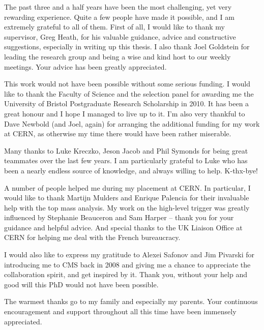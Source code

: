 


\begin{acknowledgements}
The past three and a half years have been the most challenging, yet very rewarding experience. Quite a few people have
made it possible, and I am extremely grateful to all of them. First of all, I would like to thank my supervisor, Greg
Heath, for his valuable guidance, advice and constructive suggestions, especially in writing up this thesis. I also
thank Joel Goldstein for leading the research group and being a wise and kind host to our weekly meetings. Your advice
has been greatly appreciated.

This work would not have been possible without some serious funding. I would like to thank the Faculty of Science and
the selection panel for awarding me the University of Bristol Postgraduate Research Scholarship in 2010. It has been a
great honour and I hope I managed to live up to it. I'm also very thankful to Dave Newbold (and Joel, again) for
arranging the additional funding for my work at CERN, as otherwise my time there would have been rather miserable.

Many thanks to Luke Kreczko, Jeson Jacob and Phil Symonds for being great teammates over the last few years. I am
particularly grateful to Luke who has been a nearly endless source of knowledge, and always willing to help. K-thx-bye!

A number of people helped me during my placement at CERN. In particular, I would like to thank Martijn Mulders and
Enrique Palencia for their invaluable help with the top mass analysis. My work on the high-level trigger was greatly
influenced by Stephanie Beauceron and Sam Harper -- thank you for your guidance and helpful advice. And special thanks
to the UK Liaison Office at CERN for helping me deal with the French bureaucracy.

I would also like to express my gratitude to Alexei Safonov and Jim Pivarski for introducing me to CMS back in 2008 and
giving me a chance to appreciate the collaboration spirit, and get inspired by it. Thank you, without your help and good
will this PhD would not have been possible.

The warmest thanks go to my family and especially my parents. Your continuous encouragement and support throughout all
this time have been immensely appreciated. %

\end{acknowledgements}


